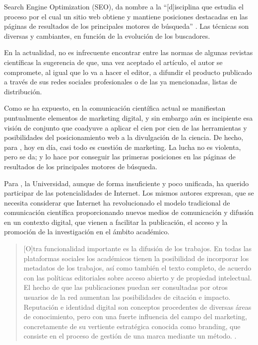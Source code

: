 \documentclass{textolivre}
\begin{document}
Search Engine Optimization (SEO), da nombre a la “[d]isciplina que estudia el proceso por el cual un sitio web obtiene y mantiene posiciones destacadas en las páginas de resultados de los principales motores de búsqueda” \cite{viteri_luque_importancia_2018}. Las técnicas son diversas y cambiantes, en función de la evolución de los buscadores.

En la actualidad, no es infrecuente encontrar entre las normas de algunas revistas científicas la sugerencia de que, una vez aceptado el artículo, el autor se compromete, al igual que lo va a hacer el editor, a difundir el producto publicado a través de sus redes sociales profesionales o de las ya mencionadas, listas de distribución.

Como se ha expuesto, en la comunicación científica actual se manifiestan puntualmente elementos de marketing digital, y sin embargo aún es incipiente esa visión de conjunto que coadyuve a aplicar el cien por cien de las herramientas y posibilidades del posicionamiento web a la divulgación de la ciencia. De hecho, para \textcite{viteri_luque_importancia_2018}, hoy en día, casi todo es cuestión de marketing. La lucha no es violenta, pero se da; y lo hace por conseguir las primeras posiciones en las páginas de resultados de los principales motores de búsqueda.

Para \textcite{siso_calvo_estrategias_2018}, la Universidad, aunque de forma insuficiente y poco unificada, ha querido participar de las potencialidades de Internet. Los mismos autores expresan, que se necesita considerar que Internet ha revolucionado el modelo tradicional de comunicación científica proporcionando nuevos medios de comunicación y difusión en un contexto digital, que vienen a facilitar la publicación, el acceso y la promoción de la investigación en el ámbito académico.

\begin{quote}
    [O]tra funcionalidad importante es la difusión de los trabajos. En todas las plataformas sociales los académicos tienen la posibilidad de incorporar los metadatos de los trabajos, así como también el texto completo, de acuerdo con las políticas editoriales sobre acceso abierto y de propiedad intelectual. El hecho de que las publicaciones puedan ser consultadas por otros usuarios de la red aumentan las posibilidades de citación e impacto. Reputación e identidad digital son conceptos procedentes de diversas áreas de conocimiento, pero con una fuerte influencia del campo del marketing, concretamente de su vertiente estratégica conocida como branding, que consiste en el proceso de gestión de una marca mediante un método. \cite[p. 71]{siso_calvo_plataformas_2020}.
\end{quote}
\end{document}
